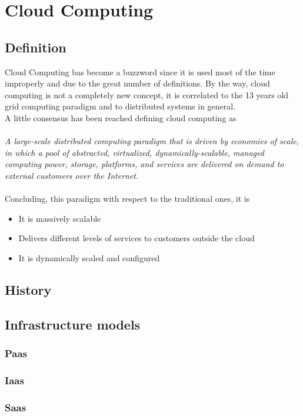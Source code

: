 \chapter{Cloud Computing}
\section{Definition}
Cloud Computing bas become a buzzword since it is used most of the time improperly and due to the great number of definitions. By the way, cloud computing is not a completely new concept, it is correlated to the 13 years old grid computing paradigm and to distributed systems in general.\cite{foster}\\
A little consensus has been reached defining cloud computing as\\\\
\textit{A large-scale distributed computing paradigm that is driven by economies of scale, in which a pool of abstracted, virtualized, dynamically-scalable, managed computing power, storage, platforms, and services are delivered on demand to external customers over the Internet.}\\\\
Concluding, this paradigm with respect to the traditional ones, it is
\begin{itemize}
    \item It is massively scalable
    \item Delivers different levels of services to customers outside the cloud
    \item It is dynamically scaled and configured
\end{itemize}
\cite{foster}
\section{History}
\section{Infrastructure models}
\subsection{Paas}
\subsection{Iaas}
\subsection{Saas}
